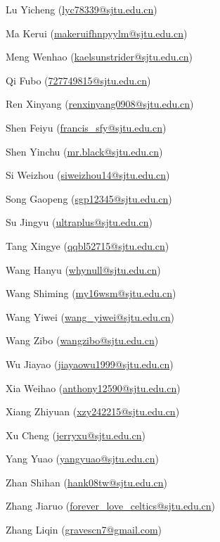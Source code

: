Lu Yicheng (\href{mailto:lyc78339@sjtu.edu.cn}{lyc78339@sjtu.edu.cn})

Ma Kerui (\href{mailto:makeruifhnpyylm@sjtu.edu.cn}{makeruifhnpyylm@sjtu.edu.cn})

Meng Wenhao (\href{mailto:kaelsunstrider@sjtu.edu.cn}{kaelsunstrider@sjtu.edu.cn})

Qi Fubo (\href{mailto:727749815@sjtu.edu.cn}{727749815@sjtu.edu.cn})

Ren Xinyang (\href{mailto:renxinyang0908@sjtu.edu.cn}{renxinyang0908@sjtu.edu.cn})

Shen Feiyu (\href{mailto:francis_sfy@sjtu.edu.cn}{francis\_sfy@sjtu.edu.cn})

Shen Yinchu (\href{mailto:mr.black@sjtu.edu.cn}{mr.black@sjtu.edu.cn})

Si Weizhou (\href{mailto:siweizhou14@sjtu.edu.cn}{siweizhou14@sjtu.edu.cn})

Song Gaopeng (\href{mailto:sgp12345@sjtu.edu.cn}{sgp12345@sjtu.edu.cn})

Su Jingyu (\href{mailto:ultraplus@sjtu.edu.cn}{ultraplus@sjtu.edu.cn})

Tang Xingye (\href{mailto:qqbl52715@sjtu.edu.cn}{qqbl52715@sjtu.edu.cn})

Wang Hanyu (\href{mailto:whynull@sjtu.edu.cn}{whynull@sjtu.edu.cn})

Wang Shiming (\href{mailto:my16wsm@sjtu.edu.cn}{my16wsm@sjtu.edu.cn})

Wang Yiwei (\href{mailto:wang_yiwei@sjtu.edu.cn}{wang\_yiwei@sjtu.edu.cn})

Wang Zibo (\href{mailto:wangzibo@sjtu.edu.cn}{wangzibo@sjtu.edu.cn})

Wu Jiayao (\href{mailto:jiayaowu1999@sjtu.edu.cn}{jiayaowu1999@sjtu.edu.cn})

Xia Weihao (\href{mailto:anthony12590@sjtu.edu.cn}{anthony12590@sjtu.edu.cn})

Xiang Zhiyuan (\href{mailto:xzy242215@sjtu.edu.cn}{xzy242215@sjtu.edu.cn})

Xu Cheng (\href{mailto:jerryxu@sjtu.edu.cn}{jerryxu@sjtu.edu.cn})

Yang Yuao (\href{mailto:yangyuao@sjtu.edu.cn}{yangyuao@sjtu.edu.cn})

Zhan Shihan (\href{mailto:hank08tw@sjtu.edu.cn}{hank08tw@sjtu.edu.cn})

Zhang Jiaruo (\href{mailto:forever_love_celtics@sjtu.edu.cn}{forever\_love\_celtics@sjtu.edu.cn})

Zhang Liqin (\href{mailto:gravescn7@gmail.com}{gravescn7@gmail.com})

